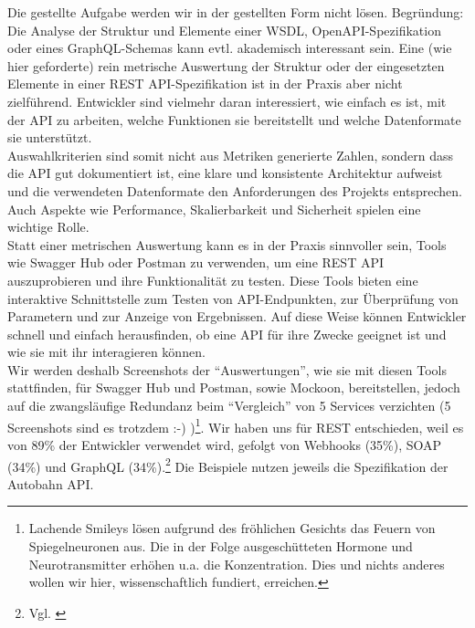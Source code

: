 \documentclass[notitlepage, hidelinks]{article}
\begin{document}
Die gestellte Aufgabe werden wir in der gestellten Form nicht lösen. Begründung: Die Analyse der Struktur und Elemente einer WSDL, OpenAPI-Spezifikation oder eines GraphQL-Schemas kann evtl. akademisch interessant sein. Eine (wie hier geforderte) rein metrische Auswertung der Struktur oder der eingesetzten Elemente in einer REST API-Spezifikation ist in der Praxis aber nicht zielführend. Entwickler sind vielmehr daran interessiert, wie einfach es ist, mit der API zu arbeiten, welche Funktionen sie bereitstellt und welche Datenformate sie unterstützt. \\
Auswahlkriterien sind somit nicht aus Metriken generierte Zahlen, sondern dass die API gut dokumentiert ist, eine klare und konsistente Architektur aufweist und die verwendeten Datenformate den Anforderungen des Projekts entsprechen. Auch Aspekte wie Performance, Skalierbarkeit und Sicherheit spielen eine wichtige Rolle. \\
Statt einer metrischen Auswertung kann es in der Praxis sinnvoller sein, Tools wie Swagger Hub oder Postman zu verwenden, um eine REST API auszuprobieren und ihre Funktionalität zu testen. Diese Tools bieten eine interaktive Schnittstelle zum Testen von API-Endpunkten, zur Überprüfung von Parametern und zur Anzeige von Ergebnissen. Auf diese Weise können Entwickler schnell und einfach herausfinden, ob eine API für ihre Zwecke geeignet ist und wie sie mit ihr interagieren können. \\
Wir werden deshalb Screenshots der ``Auswertungen'', wie sie mit diesen Tools stattfinden, für Swagger Hub und Postman, sowie Mockoon, bereitstellen, jedoch auf die zwangsläufige Redundanz beim ``Vergleich'' von 5 Services verzichten (5 Screenshots sind es trotzdem :-) )\footnote{Lachende Smileys lösen aufgrund des fröhlichen Gesichts das Feuern von Spiegelneuronen aus. Die in der Folge ausgeschütteten Hormone und Neurotransmitter erhöhen u.a. die Konzentration. Dies und nichts anderes wollen wir hier, wissenschaftlich fundiert, erreichen.\cite{wiki-spiegel}}. Wir haben uns für REST entschieden, weil es von 89\% der Entwickler verwendet wird, gefolgt von Webhooks (35\%), SOAP (34\%) und GraphQL (34\%).\footnote{Vgl. \cite{api-postman}} Die Beispiele nutzen jeweils die Spezifikation der Autobahn API.
\end{document}

